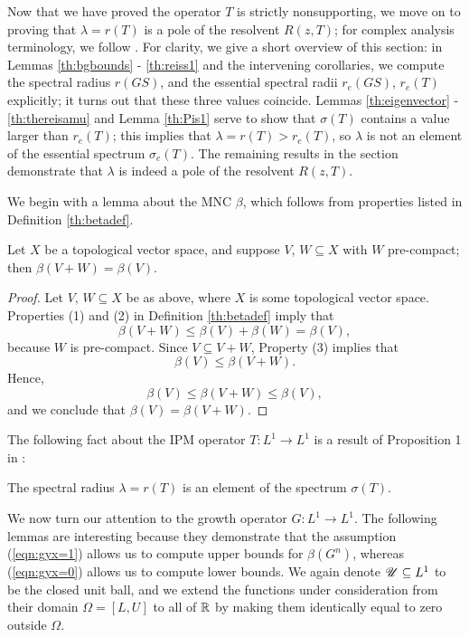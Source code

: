 Now that we have proved the operator $T$ is strictly nonsupporting, we move on to proving that $\lambda = r(T)$ is a pole of the resolvent $R(z, T)$; for complex analysis terminology, we follow  \cite{Rudin1987}. For clarity, we give a short overview of this section: in Lemmas \ref{th:bgbounds} - \ref{th:reiss1} and the intervening corollaries, we compute the spectral radius $r(GS)$, and the essential spectral radii $r_e(GS)$, $r_e(T)$ explicitly; it turns out that these three values coincide. Lemmas \ref{th:eigenvector} - \ref{th:thereisamu} and Lemma \ref{th:Pis1} serve to show that $\sigma(T)$ contains a value larger than $r_e(T)$; this implies that $\lambda = r(T) > r_e(T)$, so $\lambda$ is not an element of the essential spectrum $\sigma_e(T)$. The remaining results in the section demonstrate that $\lambda$ is indeed a pole of the resolvent $R(z, T)$.

We begin with a lemma about the MNC $\beta$, which follows from properties listed in Definition \ref{th:betadef}.

\begin{lemma}\label{th:betasum}
	Let $X$ be a topological vector space, and suppose $V$, $W \subseteq X$ with $W$ pre-compact; then $\beta(V+W) =\beta(V)$.
\end{lemma}

\begin{proof}
	Let $V$, $W \subseteq X$ be as above, where $X$ is some topological vector space.  Properties (1) and (2) in Definition \ref{th:betadef} imply that
	\[\beta(V + W) \leq \beta(V) + \beta(W) = \beta(V), \]
	because $W$ is pre-compact. Since $V \subseteq V+W$, Property (3) implies that 
	\[\beta(V) \leq \beta(V+W).\]
	Hence,
	\[\beta(V) \leq \beta(V+W) \leq \beta(V),\]
	and we conclude that $\beta(V) = \beta(V+W)$.
	
\end{proof}

The following fact about the IPM operator $T:L^1 \to L^1$ is a result of Proposition 1 in \cite{Schaefer1960}:

\begin{lemma} \label{th:lambdainspectrum}
	The spectral radius $\lambda = r(T)$ is an element of the spectrum $\sigma(T)$.
\end{lemma}

We now turn our attention to the growth operator $G:L^1 \to L^1$. The following lemmas are interesting because they demonstrate that the assumption (\ref{eqn:gyx=1}) allows us to compute upper bounds for $\beta(G^n)$, whereas (\ref{eqn:gyx=0}) allows us to compute lower bounds. We again denote $\mathscr U \subseteq L^1$ to be the closed unit ball, and we extend the functions under consideration from their domain $\Omega=[L,U]$ to all of $\mathbb{R}$ by making them identically equal to zero outside $\Omega$.

